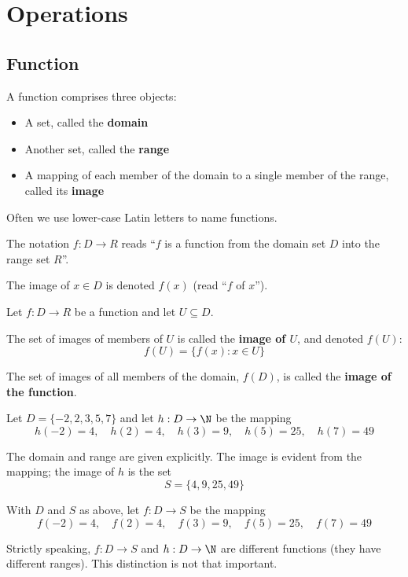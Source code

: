 \section{Operations}

\subsection{Function}

\begin{definition}[Function]\label{def:function}
    A function comprises three objects:
    \begin{itemize}
        \item A set, called the \textbf{domain}
        \item Another set, called the \textbf{range}
        \item A mapping of each member of the domain to a single member of the range, called its \textbf{image}
    \end{itemize}
\end{definition}

\begin{notation}
    Often we use lower-case Latin letters to name functions.
    
    The notation $f: D \to R$ reads ``$f$ is a function from the domain set $D$ into the range set $R$''.
    
    The image of $x \in D$ is denoted $f(x)$ (read ``$f$ of $x$'').
\end{notation}

\begin{definition}\label{def:image}
    Let $f: D \to R$ be a function and let $U \subseteq D$.
    
    The set of images of members of $U$ is called the \textbf{image of $U$}, and denoted $f(U)$:
    \[
        f(U) = \{f(x) : x \in U\}
    \]
    
    The set of images of all members of the domain, $f(D)$, is called the \textbf{image of the function}.
\end{definition}

\begin{eg}
    Let $D = \{-2, 2, 3, 5, 7\}$ and let $h: D \to \N$ be the mapping
    \[
        h(-2) = 4, \quad h(2) = 4, \quad h(3) = 9, \quad h(5) = 25, \quad h(7) = 49
    \]
    
    The domain and range are given explicitly. The image is evident from the mapping; the image of $h$ is the set
    \[
        S = \{4, 9, 25, 49\}
    \]
    
    With $D$ and $S$ as above, let $f: D \to S$ be the mapping
    \[
        f(-2) = 4, \quad f(2) = 4, \quad f(3) = 9, \quad f(5) = 25, \quad f(7) = 49
    \]
    
    Strictly speaking, $f: D \to S$ and $h: D \to \N$ are different functions (they have different ranges). This distinction is not that important.
\end{eg}

